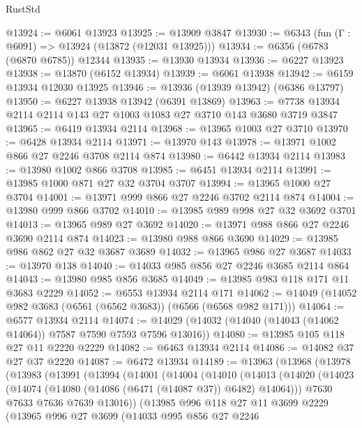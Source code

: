 \begin{lexlean}{RustStd}
\begin{coremodule}
{\begin{coremodule}
{{{{{{{{{{{{{{{{{{{{{{{{{{@13924 := @6061 @13923
@13925 := @13909 @3847
@13930 := @6343 (fun (Γ : @6091) => @13924 (@13872 (@12031 @13925)))
@13934 := @6356 (@6783 (@6870 @6785)) @12344
@13935 := @13930 @13934
@13936 := @6227 @13923
@13938 := @13870 (@6152 @13934)
@13939 := @6061 @13938
@13942 := @6159 @13934 @12030 @13925
@13946 := @13936 (@13939 @13942) (@6386 @13797)
@13950 := @6227 @13938 @13942 (@6391 @13869)
@13963 := @7738 @13934 @2114 @2114 @143 @27 @1003 @1083 @27 @3710 @143 @3680 @3719 @3847
@13965 := @6419 @13934 @2114
@13968 := @13965 @1003 @27 @3710
@13970 := @6428 @13934 @2114
@13971 := @13970 @143
@13978 := @13971 @1002 @866 @27 @2246 @3708 @2114 @874
@13980 := @6442 @13934 @2114
@13983 := @13980 @1002 @866 @3708
@13985 := @6451 @13934 @2114
@13991 := @13985 @1000 @871 @27 @32 @3704 @3707
@13994 := @13965 @1000 @27 @3704
@14001 := @13971 @999 @866 @27 @2246 @3702 @2114 @874
@14004 := @13980 @999 @866 @3702
@14010 := @13985 @989 @998 @27 @32 @3692 @3701
@14013 := @13965 @989 @27 @3692
@14020 := @13971 @988 @866 @27 @2246 @3690 @2114 @874
@14023 := @13980 @988 @866 @3690
@14029 := @13985 @986 @862 @27 @32 @3687 @3689
@14032 := @13965 @986 @27 @3687
@14033 := @13970 @138
@14040 := @14033 @985 @856 @27 @2246 @3685 @2114 @864
@14043 := @13980 @985 @856 @3685
@14049 := @13985 @983 @118 @171 @11 @3683 @2229
@14052 := @6553 @13934 @2114 @171
@14062 := @14049 (@14052 @982 @3683 (@6561 (@6562 @3683)) (@6566 (@6568 @982 @171)))
@14064 := @6577 @13934 @2114
@14074 := @14029 (@14032 (@14040 (@14043 (@14062 @14064)) @7587 @7590 @7593 @7596 @13016))
@14080 := @13985 @105 @118 @27 @11 @2220 @2229
@14082 := @6463 @13934 @2114
@14086 := @14082 @37 @27 @37 @2220
@14087 := @6472 @13934
@14189 := @13963
    (@13968
      (@13978
        (@13983
          (@13991
            (@13994
              (@14001
                (@14004
                  (@14010
                    (@14013
                      (@14020
                        (@14023 (@14074 (@14080 (@14086 (@6471 (@14087 @37)) @6482) @14064)))
                        @7630
                        @7633
                        @7636
                        @7639
                        @13016))
                    (@13985
                      @996
                      @118
                      @27
                      @11
                      @3699
                      @2229
                      (@13965
                        @996
                        @27
                        @3699
                        (@14033
                          @995
                          @856
                          @27
                          @2246
}}}}}}}}}}}}}}}}}}}}}}}}}}
\end{coremodule}}
\end{coremodule}
\end{lexlean}
